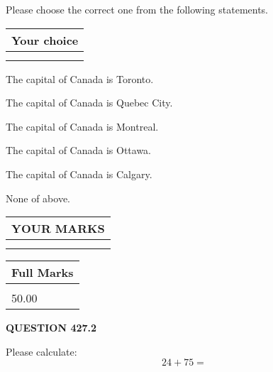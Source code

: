 \documentclass[12pt]{article}
\begin{document}
  
Please choose the correct one from the following statements.
  
  
\noindent\hspace{3.0in} \begin{tabular}{|l|}
\hline
Your choice \\
\hline
 \\ 
 \\ 
\hline
\end{tabular}
  
  
 
 
The capital of Canada is Toronto.
 
 
The capital of Canada is Quebec City.
 
 
The capital of Canada is Montreal.
 
 
The capital of Canada is Ottawa.
 
 
The capital of Canada is Calgary.
 
 
 None of above.
 
 
  
\vspace{0.2in}
  
\noindent\begin{tabular}{|l|}
\hline
 YOUR MARKS  \\
\hline
 \\ 
 \\ 
\hline
\end{tabular}
\hspace{0.05in} \begin{tabular}{|l|}
\hline
 Full Marks  \\
\hline
 \\ 
50.00 \\
\hline
\end{tabular}
{\textbf{\Large{QUESTION
427.2 
}}}
  
  
 
Please calculate:
\begin{equation}
24 +  %
75 = \nonumber
\end{equation}
 

 

 
   
   
 \vspace{0.2in}
 
   
   
   
   
\end{document}
